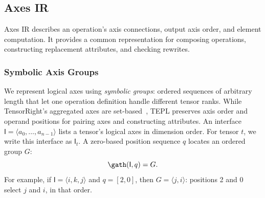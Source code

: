 \subsection{Axes IR}
\label{sec:axes-ir}
Axes IR describes an operation's axis connections, output axis order,
and element computation. It provides a common representation for composing
operations, constructing replacement attributes, and checking rewrites.

\subsubsection{Symbolic Axis Groups}
\label{sec:axis-groups}
We represent logical axes using \emph{symbolic groups}: ordered sequences
of arbitrary length that let one operation definition handle different
tensor ranks. While TensorRight's aggregated axes are set-based~\cite{tensorright},
TEPL preserves axis order and operand positions for pairing axes and
constructing attributes. An interface
$\mathsf{I}=\langle a_0,\ldots,a_{n-1}\rangle$ lists a tensor's logical axes in dimension
order. For tensor $t$, we write this interface as $\mathsf{I}_t$.
A zero-based position sequence $q$ locates an ordered group $G$:
\begin{equation}
 \gath(\mathsf{I},q)=G.
 \label{eq:mapping}
\end{equation}
For example, if $\mathsf{I}=\langle i,k,j\rangle$ and $q=[2,0]$,
then $G=\langle j,i\rangle$: positions 2 and 0 select $j$ and $i$,
in that order.


